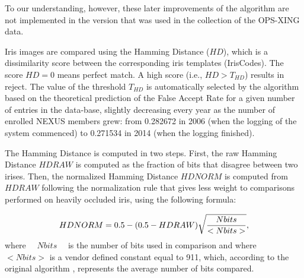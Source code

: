 \documentclass{cta-author}%
\begin{document}
To our understanding, however, these later improvements of the algorithm are not implemented in the version that was used in the collection of the OPS-XING data.

Iris images are compared using the Hamming Distance ($HD$), which is a dissimilarity score between the corresponding  iris templates (IrisCodes). 
The score $HD=0$ means perfect match.  A high score (i.e., $HD >T_{HD}$) results in reject. The value of the threshold $T_{HD}$ is automatically selected by the algorithm based on the theoretical prediction of the False Accept Rate for a given number of entries in the data-base, slightly decreasing every year as the number of enrolled NEXUS members grew: from 0.282672 in 2006 (when the logging of the system commenced) to 0.271534 in 2014 (when the logging finished).

The Hamming Distance is computed in two steps.
First, the raw Hamming Distance $HDRAW$ is computed as the fraction of bits that disagree between two irises.
Then, the normalized Hamming Distance $HDNORM$ is computed from $HDRAW$ following the normalization rule that gives less weight to comparisons performed on heavily occluded iris, using the following formula:

\begin{equation}
HDNORM = 0.5-(0.5-HDRAW)\sqrt{  Nbits \over <Nbits>},  
\label{EQN}
\end{equation}
where ~~$Nbits$~~ is  the number of bits used in comparison  
and where~~
$<Nbits>$ is a vendor defined constant equal to 911, which, according to the original algorithm \cite{Daugman2006}, represents the average number of bits compared. 
\end{document}
